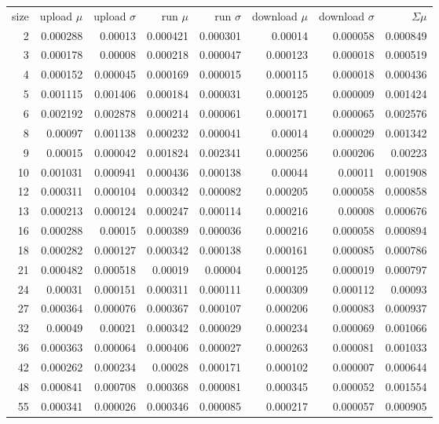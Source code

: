 \begin{longtable}{r r r r r r r r}
size & upload $\mu$  & upload $\sigma$ & run $\mu$ & run $\sigma$ & download $\mu$ & download $\sigma$ & $\Sigma \mu$ \\
2 & 0.000288 & 0.00013 & 0.000421 & 0.000301 & 0.00014 & 0.000058 & 0.000849 \\
3 & 0.000178 & 0.00008 & 0.000218 & 0.000047 & 0.000123 & 0.000018 & 0.000519 \\
4 & 0.000152 & 0.000045 & 0.000169 & 0.000015 & 0.000115 & 0.000018 & 0.000436 \\
5 & 0.001115 & 0.001406 & 0.000184 & 0.000031 & 0.000125 & 0.000009 & 0.001424 \\
6 & 0.002192 & 0.002878 & 0.000214 & 0.000061 & 0.000171 & 0.000065 & 0.002576 \\
8 & 0.00097 & 0.001138 & 0.000232 & 0.000041 & 0.00014 & 0.000029 & 0.001342 \\
9 & 0.00015 & 0.000042 & 0.001824 & 0.002341 & 0.000256 & 0.000206 & 0.00223 \\
10 & 0.001031 & 0.000941 & 0.000436 & 0.000138 & 0.00044 & 0.00011 & 0.001908 \\
12 & 0.000311 & 0.000104 & 0.000342 & 0.000082 & 0.000205 & 0.000058 & 0.000858 \\
13 & 0.000213 & 0.000124 & 0.000247 & 0.000114 & 0.000216 & 0.00008 & 0.000676 \\
16 & 0.000288 & 0.00015 & 0.000389 & 0.000036 & 0.000216 & 0.000058 & 0.000894 \\
18 & 0.000282 & 0.000127 & 0.000342 & 0.000138 & 0.000161 & 0.000085 & 0.000786 \\
21 & 0.000482 & 0.000518 & 0.00019 & 0.00004 & 0.000125 & 0.000019 & 0.000797 \\
24 & 0.00031 & 0.000151 & 0.000311 & 0.000111 & 0.000309 & 0.000112 & 0.00093 \\
27 & 0.000364 & 0.000076 & 0.000367 & 0.000107 & 0.000206 & 0.000083 & 0.000937 \\
32 & 0.00049 & 0.00021 & 0.000342 & 0.000029 & 0.000234 & 0.000069 & 0.001066 \\
36 & 0.000363 & 0.000064 & 0.000406 & 0.000027 & 0.000263 & 0.000081 & 0.001033 \\
42 & 0.000262 & 0.000234 & 0.00028 & 0.000171 & 0.000102 & 0.000007 & 0.000644 \\
48 & 0.000841 & 0.000708 & 0.000368 & 0.000081 & 0.000345 & 0.000052 & 0.001554 \\
55 & 0.000341 & 0.000026 & 0.000346 & 0.000085 & 0.000217 & 0.000057 & 0.000905 \\

\end{longtable}
